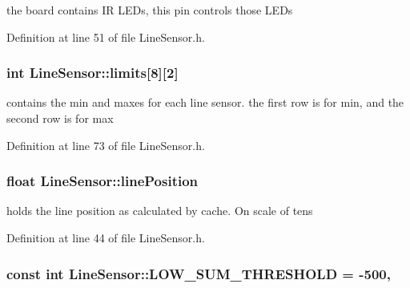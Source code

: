the board contains I\-R L\-E\-Ds, this pin controls those L\-E\-Ds 



Definition at line 51 of file Line\-Sensor.\-h.

\hypertarget{classLineSensor_ae17bcec64c67b17748d50401e79d5c6f}{
\subsubsection[{limits}]{\setlength{\rightskip}{0pt plus 5cm}int Line\-Sensor\-::limits\mbox{[}8\mbox{]}\mbox{[}2\mbox{]}\hspace{0.3cm}{\ttfamily [private]}}}\label{classLineSensor_ae17bcec64c67b17748d50401e79d5c6f}


contains the min and maxes for each line sensor. the first row is for min, and the second row is for max 



Definition at line 73 of file Line\-Sensor.\-h.

\hypertarget{classLineSensor_ac21af83a73e9e55500324d9d34ed2498}{
\subsubsection[{line\-Position}]{\setlength{\rightskip}{0pt plus 5cm}float Line\-Sensor\-::line\-Position\hspace{0.3cm}{\ttfamily [private]}}}\label{classLineSensor_ac21af83a73e9e55500324d9d34ed2498}


holds the line position as calculated by cache. On scale of tens 



Definition at line 44 of file Line\-Sensor.\-h.

\hypertarget{classLineSensor_a929091ad1746a0a337c2259ba79c959a}{
\subsubsection[{L\-O\-W\-\_\-\-S\-U\-M\-\_\-\-T\-H\-R\-E\-S\-H\-O\-L\-D}]{\setlength{\rightskip}{0pt plus 5cm}const int Line\-Sensor\-::\-L\-O\-W\-\_\-\-S\-U\-M\-\_\-\-T\-H\-R\-E\-S\-H\-O\-L\-D = -\/500\hspace{0.3cm}{\ttfamily [static]}, {\ttfamily [private]}}}\label{classLineSensor_a929091ad1746a0a337c2259ba79c959a}


